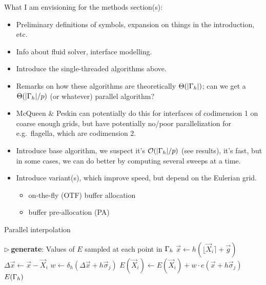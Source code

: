 \clearpage

\bgroup
\color{red}
What I am envisioning for the methods section(s):
\begin{itemize}
    \item Preliminary definitions of symbols, expansion on things in the
        introduction, etc.
    \item Info about fluid solver, interface modelling.
    \item Introduce the single-threaded algorithms above.
    \item Remarks on how these algorithms are theoretically $\Theta(|\Gamma_h|)$;
        can we get a $\Theta(|\Gamma_h|/p)$ (or whatever) parallel algorithm?
    \item McQueen \& Peskin can potentially do this for interfaces of codimension 1
        on coarse enough grids, but have potentially no/poor parallelization for
        e.g.\ flagella, which are codimension 2.
    \item Introduce base algorithm, we suspect it's $\mathcal{O}(|\Gamma_h|/p)$ (see results),
        it's fast, but in some cases, we can do better by computing several sweeps at a time.
    \item Introduce variant(s), which improve speed, but depend on the Eulerian grid.
        \begin{itemize}
            \item on-the-fly (OTF) buffer allocation
            \item buffer pre-allocation (PA)
        \end{itemize}
\end{itemize}


\begin{algorithm}
\caption{Parallel interpolation}
\label{algo:par-interp}
\begin{algorithmic}[1]
\State $\triangleright\ $\textbf{generate}: Values of $E$ sampled at each point in $\Gamma_h$
    \State $\vec{x} \gets h(\lfloor\vec{X}_i\rceil+\vec{g})$
    \State $\Delta\vec{x} \gets \vec{x}-\vec{X}_i$
        \State $w \gets \delta_h(\Delta\vec{x}+h\vec{\sigma}_j)$
        \State $E(\vec{X}_i) \gets E(\vec{X}_i) + w \cdot e(\vec{x}+h\vec{\sigma}_j)$
    \EndFor
\EndFor
\State \Return $E(\Gamma_h)$
\EndProcedure
\end{algorithmic}
\end{algorithm}

